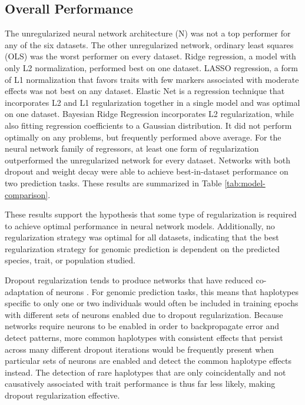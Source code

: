 
\subsection*{Overall Performance}

The unregularized neural network architecture (N) was not a top performer for 
any of the six datasets. The other unregularized network, ordinary least 
squares (OLS) was the worst performer on every dataset. Ridge regression, 
a model with only L2 normalization, performed best on one dataset. 
LASSO regression, a form of L1 normalization that favors traits with few 
markers associated with moderate effects was not best on any dataset. 
Elastic Net is a regression technique that incorporates L2 and L1 
regularization together in a single model and was optimal on one dataset. 
Bayesian Ridge Regression incorporates L2 regularization, while also fitting 
regression coefficients to a Gaussian distribution. It did not perform optimally 
on any problems, but frequently performed above average. For the neural 
network family of regressors, at least one form of regularization 
outperformed the unregularized network for every dataset. Networks with 
both dropout and weight decay were able to achieve best-in-dataset 
performance on two prediction tasks. These results are summarized 
in Table \ref{tab:model-comparison}.

\ifdefined\showtablesandfigures
\fi

These results support the hypothesis that some type of regularization 
is required to achieve optimal performance in neural network models. 
Additionally, no regularization strategy was optimal for 
all datasets, indicating that the best regularization strategy for 
genomic prediction is dependent on the predicted species, trait, 
or population studied.  

Dropout regularization tends to produce networks that have reduced 
co-adaptation of neurons \citep{srivastava2014}. For genomic prediction 
tasks, this means that haplotypes specific to only one or two 
individuals would often be included in training epochs with 
different sets of neurons enabled due to dropout regularization. Because
networks require neurons to be enabled in order to backpropagate error 
and detect patterns, more common haplotypes with consistent effects 
that persist across many different dropout iterations would be 
frequently present when particular sets of neurons are enabled and detect the
common haplotype effects instead. The detection of rare haplotypes 
that are only coincidentally and not causatively associated with 
trait performance is thus far less likely, making dropout 
regularization effective.

